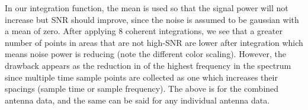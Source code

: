 In our integration function, the mean is used so that the signal power will not increase but SNR should improve, since the noise is assumed to be gaussian with a mean of zero. After applying 8 coherent integrations, we see that a greater number of points in areas that are not high-SNR are lower after integration which means noise power is reducing (note the different color scaling). 
However, the drawback appears as the reduction in of the highest frequency in the spectrum since multiple time sample points are collected as one which increases their spacings (sample time or sample frequency). The above is for the combined antenna data, and the same can be said for any individual antenna data.\\


